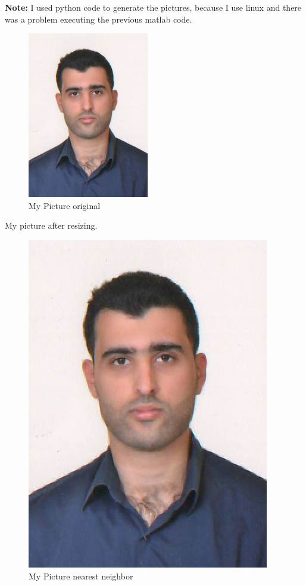 \documentclass{article}
\begin{document}
\textbf{Note:} I used python code to generate the pictures, because I use linux and there was a problem executing the previous matlab code.
\begin{figure}[H]
	\begin{center}
		\includegraphics[scale=1]{mupictureorignalgrayscal.png}
	\end{center}
	\caption{My Picture original} 
\end{figure}
My picture after resizing.
\begin{figure}[H]
	\begin{center}
		\includegraphics[scale=1]{mypictureNearst.png}
	\end{center}
	\caption{My Picture nearest  neighbor} 
\end{figure}
\end{document}
